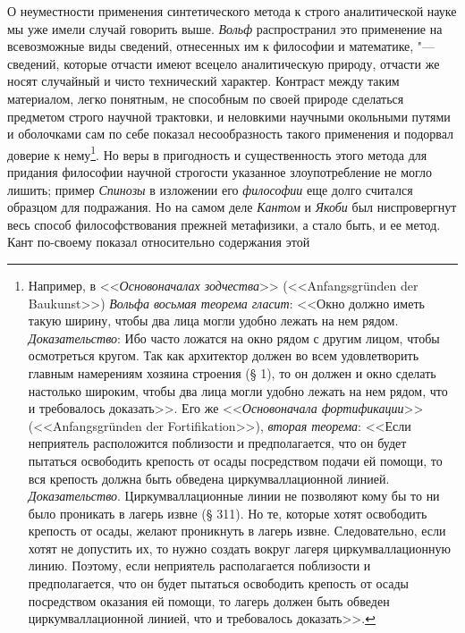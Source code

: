 {{О неуместности применения синтетического метода к строго
аналитической науке мы уже имели случай говорить выше.
{\em Вольф} распространил
это применение на всевозможные виды сведений, отнесенных им к философии и
математике, "--- сведений, которые отчасти имеют всецело
аналитическую природу, отчасти же носят случайный и чисто технический
характер. Контраст между таким материалом, легко понятным, не способным по
своей природе сделаться предметом строго научной трактовки, и неловкими
научными окольными путями и оболочками сам по себе показал
несообразность такого применения и подорвал доверие к
нему\footnote{Например, в
<<{\em Основоначалах зодчества}>>
(<<Anfangsgründen der Baukunst>>)
{\em Вольфа восьмая теорема гласит}:
<<Окно должно иметь такую ширину, чтобы два лица
могли удобно лежать на нем рядом.
{\em Доказательство}:
Ибо часто ложатся на окно рядом с другим лицом, чтобы
осмотреться кругом. Так как архитектор должен во всем удовлетворить главным
намерениям хозяина строения (§ 1), то он должен и окно сделать настолько
широким, чтобы два лица могли удобно лежать на нем рядом, что и требовалось
доказать>>. Его же
<<{\em Основоначала фортификации}>>
(<<Anfangsgründen der Fortifikation>>),
{\em вторая теорема}:
<<Если неприятель расположится поблизости и предполагается,
что он будет пытаться освободить крепость от осады посредством подачи ей
помощи, то вся крепость должна быть обведена циркумваллационной
линией.
{\em Доказательство}.
Циркумваллационные линии не позволяют кому бы то ни было
проникать в лагерь извне (§ 311). Но те, которые хотят освободить крепость
от осады, желают проникнуть в лагерь извне. Следовательно, если хотят не
допустить их, то нужно создать вокруг лагеря циркумваллационную линию.
Поэтому, если неприятель располагается поблизости и предполагается, что он
будет пытаться освободить крепость от осады посредством оказания ей помощи,
то лагерь должен быть обведен циркумваллационной линией, что и требовалось
доказать>>.}. Но веры в пригодность и существенность этого
метода для придания философии научной строгости указанное злоупотребление
не могло лишить; пример {\em Спинозы}
в изложении его
{\em философии} еще долго
считался образцом для подражания. Но на самом деле
{\em Кантом} и
{\em Якоби} был
ниспровергнут весь способ философствования прежней метафизики, а стало
быть, и ее метод. Кант по-своему показал относительно содержания этой
}}
